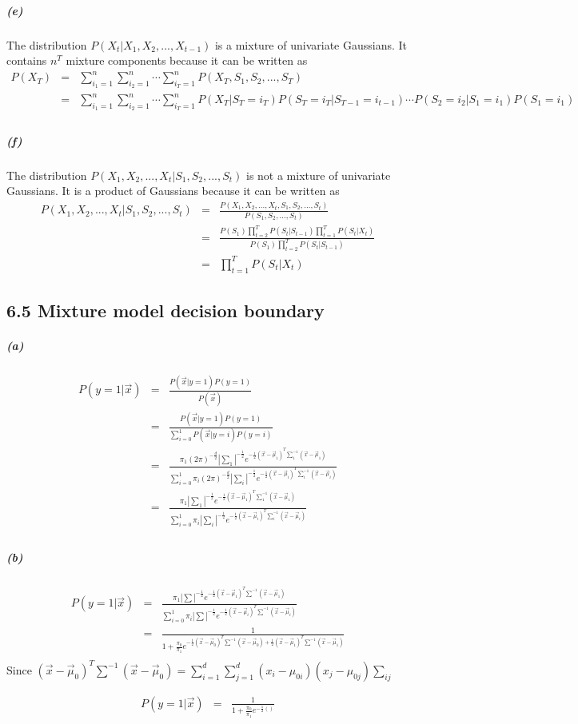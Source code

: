 \documentclass{article}
\begin{document}
\subparagraph*{(e)}
The distribution $P(X_t | X_1, X_2, ..., X_{t-1})$ is a mixture of univariate Gaussians.
It contains $n^T$ mixture components because it can be written as
\begin{eqnarray*}
	P(X_T) &=& \sum_{i_1=1}^{n}\sum_{i_2=1}^{n}\cdots\sum_{i_T=1}^{n} P(X_T, S_1, S_2, ..., S_T)\\
	&=& \sum_{i_1=1}^{n}\sum_{i_2=1}^{n}\cdots\sum_{i_T=1}^{n}P(X_T|S_T=i_T)P(S_T=i_T|S_{T-1}=i_{t-1})\cdots  P(S_2=i_2|S_1=i_1)P(S_1 = i_1)\\
\end{eqnarray*}

\subparagraph*{(f)}
The distribution $P(X_1, X_2, ..., X_t | S_1, S_2, ..., S_t)$ is not a mixture of univariate Gaussians.
It is a product of Gaussians because it can be written as
\begin{eqnarray*}
	P(X_1, X_2, ..., X_t | S_1, S_2, ..., S_t) &=& \frac{P(X_1, X_2, ..., X_t , S_1, S_2, ..., S_t)}{P( S_1, S_2, ..., S_t)}\\
	&=& \frac{P(S_1)\prod_{t=2}^{T}P(S_t | S_{t-1})\prod_{t=1}^{T}P(S_t | X_t)}{P(S_1)\prod_{t=2}^{T}P(S_t | S_{t-1})}\\
	&=&  \prod_{t=1}^{T}P(S_t | X_t)
\end{eqnarray*}

\subsection*{6.5 Mixture model decision boundary}
\subparagraph*{(a)}
\begin{eqnarray*}
	P(y=1 | \vec{x}) &=& \frac{P (\vec{x} | y=1)P(y=1)}{P(\vec{x})}\\
	&=& \frac{P (\vec{x} | y=1)P(y=1)}{\sum_{i=0}^1 P(\vec{x}|y=i)P(y=i)}\\
	&=& \frac{\pi_1 (2\pi)^{-\frac{d}{2}}|\sum_1|^{-\frac{1}{2}}e^{-\frac{1}{2}(\vec{x}-\vec{\mu}_1)^T\sum_{1}^{-1}(\vec{x}-\vec{\mu}_1)}}{\sum_{i=0}^1 \pi_i (2\pi)^{-\frac{d}{2}}|\sum_i|^{-\frac{1}{2}}e^{-\frac{1}{2}(\vec{x}-\vec{\mu}_i)^T\sum_{i}^{-1}(\vec{x}-\vec{\mu}_i)}}\\
	&=& \frac{\pi_1 |\sum_1|^{-\frac{1}{2}}e^{-\frac{1}{2}(\vec{x}-\vec{\mu}_1)^T\sum_{1}^{-1}(\vec{x}-\vec{\mu}_1)}}{\sum_{i=0}^1 \pi_i |\sum_i|^{-\frac{1}{2}}e^{-\frac{1}{2}(\vec{x}-\vec{\mu}_i)^T\sum_{i}^{-1}(\vec{x}-\vec{\mu}_i)}}\\
\end{eqnarray*}

\subparagraph*{(b)}
\begin{eqnarray*}
	P(y=1 | \vec{x}) &=& \frac{\pi_1 |\sum|^{-\frac{1}{2}}e^{-\frac{1}{2}(\vec{x}-\vec{\mu}_1)^T\sum^{-1}(\vec{x}-\vec{\mu}_1)}}{\sum_{i=0}^1 \pi_i |\sum|^{-\frac{1}{2}}e^{-\frac{1}{2}(\vec{x}-\vec{\mu}_i)^T\sum^{-1}(\vec{x}-\vec{\mu}_i)}}\\
	&=& \frac{1}{1 +  \frac{\pi_0}{\pi_1} e^{-\frac{1}{2}(\vec{x}-\vec{\mu}_0)^T\sum^{-1}(\vec{x}-\vec{\mu}_0)+\frac{1}{2}(\vec{x}-\vec{\mu}_1)^T\sum^{-1}(\vec{x}-\vec{\mu}_1)}}\\
\end{eqnarray*}
Since $(\vec{x}-\vec{\mu}_0)^T\sum^{-1}(\vec{x}-\vec{\mu}_0) = \sum_{i=1}^{d}\sum_{j=1}^{d}(x_i - \mu_{0i})(x_j - \mu_{0j})\sum_{ij}$

\begin{eqnarray*}
	P(y=1 | \vec{x}) &=& \frac{1}{1 +  \frac{\pi_0}{\pi_1} e^{-\frac{1}{2}()}}\\
\end{eqnarray*}
\end{document}
